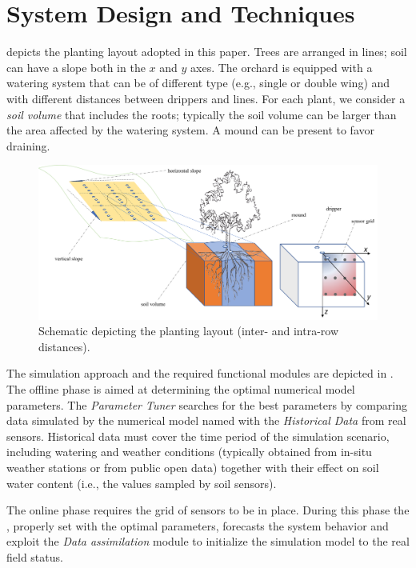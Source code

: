\section{System Design and Techniques}
  depicts the planting layout adopted in this paper. Trees are arranged in lines; soil can have a slope both in the $x$ and $y$ axes. The orchard is equipped with a watering system that can be of different type (e.g., single or double wing) and with different distances between drippers and lines. For each plant, we consider a \emph{soil volume} that includes the roots; typically the soil volume can be larger than the area affected by the watering system. A mound can be present to favor draining.
 \begin{figure}[t]
	\centering
	\includegraphics[scale=0.5]{chapters/physics-aware/orchard/img/OverallPlantingLayout3.png}
	\caption{Schematic depicting the planting layout (inter- and intra-row distances).}
	\label{orchard-fig:scheme1}
\end{figure} 


The simulation approach and the required functional modules are depicted in . The offline phase is aimed at determining the optimal numerical model parameters. The \emph{Parameter Tuner} searches for the best parameters by comparing data simulated by the numerical model named \olab{} with the \emph{Historical Data} from real sensors.
Historical data must cover the time period of the simulation scenario, including watering and weather conditions (typically obtained from in-situ weather stations or from public open data) together with their effect on soil water content (i.e., the values sampled by soil sensors). 

The online phase requires the grid of sensors to be in place. During this phase the \olab{}, properly set with the optimal parameters, forecasts the system behavior and exploit the \emph{Data assimilation} module to initialize the simulation model to the real field status.

